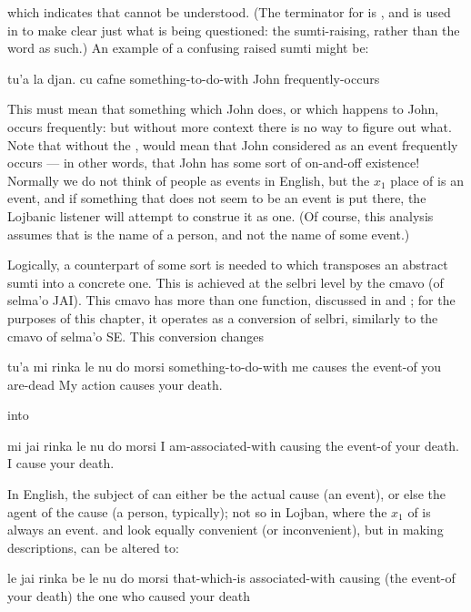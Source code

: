 {\noindent}which indicates that  cannot be understood.
    (The terminator for  is , and is used in  to make clear just what is being
    questioned: the sumti-raising, rather than the word 
    as such.) An example of a confusing raised sumti might be:
\begin{example}
tu'a la djan. cu cafne\n
something-to-do-with John frequently-occurs
\end{example}

This must mean that something which John does, or which
    happens to John, occurs frequently: but without more context
    there is no way to figure out what. Note that without the
    ,  would mean that
    John considered as an event frequently occurs --- in other
    words, that John has some sort of on-and-off existence!
    Normally we do not think of people as events in English, but
    the $x_1$ place of  is an event, and if something that
    does not seem to be an event is put there, the Lojbanic
    listener will attempt to construe it as one. (Of course, this
    analysis assumes that  is the name of a person, and
    not the name of some event.)

Logically, a counterpart of some sort is needed to 
    which transposes an abstract sumti into a concrete one. This is
    achieved at the selbri level by the cmavo  (of selma'o
    JAI). This cmavo has more than one function, discussed in  and ; for the purposes of this
    chapter, it operates as a conversion of selbri, similarly to
    the cmavo of selma'o SE. This conversion changes
\begin{example}
tu'a mi rinka\n
\T	le nu do morsi\n
something-to-do-with me causes\n
\T	the event-of you are-dead\n
My action causes your death.
\end{example}

{\noindent}into
\begin{example}
mi jai rinka le nu do morsi\n
I am-associated-with causing the event-of your death.\n
I cause your death.
\end{example}

In English, the subject of  can either be the
    actual cause (an event), or else the agent of the cause (a
    person, typically); not so in Lojban, where the $x_1$ of 
    is always an event.  and  look equally convenient (or
    inconvenient), but in making descriptions,  can be altered to:
\begin{example}
le jai rinka\n
\T	be le nu do morsi\n
that-which-is associated-with causing\n
\T	(the event-of your death)\n
the one who caused your death
\end{example}

